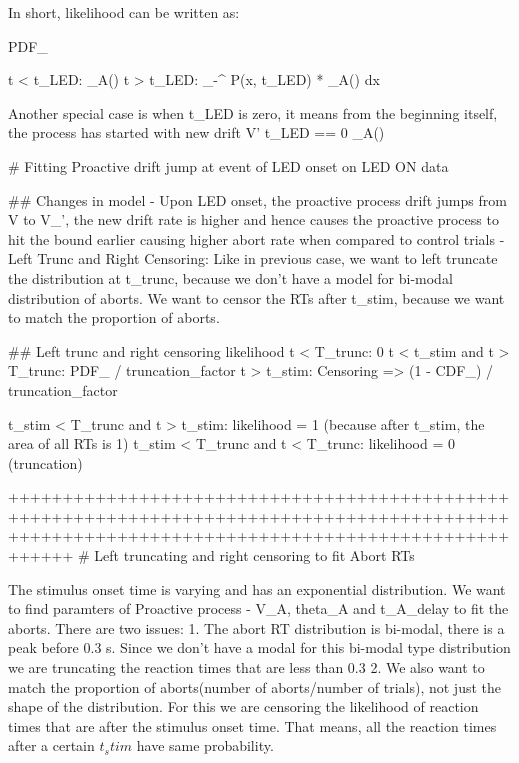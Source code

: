  In short, likelihood can be written as:

 PDF_{}
 
t < t_LED: \rho_A()
t > t_LED: \int_{-\inf}^{\theta} P(x, t_{LED}) * \rho_A() dx

Another special case is when t_LED is zero, it means from the beginning itself, the process has started with new drift V'
t_LED == 0 \rho_A()


# Fitting Proactive drift jump at event of LED onset on LED ON data


## Changes in model
- Upon LED onset, the proactive process drift jumps from V to V_', the new drift rate is higher and hence causes the 
proactive process to hit the bound earlier causing higher abort rate when compared to control trials
- Left Trunc and Right Censoring: Like in previous case, we want to left truncate the distribution at t_trunc, because we don't have a model for 
bi-modal distribution of aborts. We want to censor the RTs after t_stim, because we want to match the proportion of aborts.


## Left trunc and right censoring likelihood
t < T_trunc: 0
t < t_stim and t > T_trunc: PDF_{} / truncation_factor
t > t_stim: Censoring => (1 - CDF_{}) / truncation_factor

t_stim < T_trunc and t > t_stim: likelihood = 1 (because after t_stim, the area of all RTs is 1)
t_stim < T_trunc and t < T_trunc: likelihood = 0 (truncation)


























++++++++++++++++++++++++++++++++++++++++++++++++++++++++++++++++++++++++++++++++++++++++++++++++++++++++++++++++++++++++++++++++++++++++++++++++
# Left truncating and right censoring to fit Abort RTs

The stimulus onset time is varying and has an exponential distribution. We want to find paramters of Proactive process 
- V_A, theta_A and t_A_delay to fit the aborts. There are two issues:
1. The abort RT distribution is bi-modal, there is a peak before 0.3 s. Since we don't have a modal for this bi-modal type distribution
we are truncating the reaction times that are less than 0.3
2. We also want to match the proportion of aborts(number of aborts/number of trials), not just the shape of the distribution. 
For this we are censoring the likelihood of reaction times that are after the stimulus onset time. That means, all the reaction times
after a certain  $t_stim$ have same probability.

